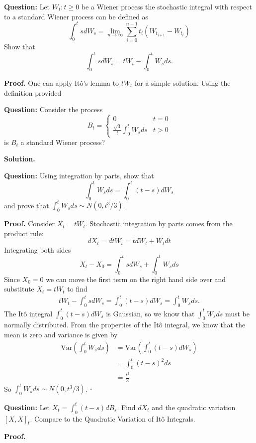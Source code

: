 \documentclass{article}
\begin{document}
\begin{tcolorbox}[colframe=black,colback=gray!5,boxrule=0.5pt]
\textbf{Question:} Let $W_t : t\geq0$ be a Wiener process the stochastic integral with respect to a standard Wiener process can be defined as 
$$\int_0^ts dW_s = \lim_{n\to\infty}\sum_{i=0}^{n-1}t_i(W_{t_{i+1} } - W_{t_i})$$
Show that 
$$\int_0^tsdW_s = tW_t - \int_0^tW_sds.$$
\end{tcolorbox}
\textbf{Proof.} One can apply Itô's lemma to $tW_t$ for a simple solution. Using the definition provided


\begin{tcolorbox}[colframe=black,colback=gray!5,boxrule=0.5pt]
\textbf{Question:} Consider the process 
$$
B_t = \begin{cases}
    0 & t=0 \\
    \frac{\sqrt{3}}{t}\int_0^tW_s ds & t>0
\end{cases}
$$
is $B_t$ a standard Wiener process? 
\end{tcolorbox}
\textbf{Solution.}


\begin{tcolorbox}[colframe=black,colback=gray!5,boxrule=0.5pt]
\textbf{Question:} Using integration by parts, show that 
$$\int_0^tW_sds = \int_0^t(t-s)dW_s$$
and prove that $\int_0^t W_sds\sim N(0, t^3/3)$. 
\end{tcolorbox}
\textbf{Proof.} Consider $X_t = tW_t$. Stochastic integration by parts comes from the product rule: 
$$dX_t = dtW_t = tdW_t +W_tdt$$
Integrating both sides 
$$X_t - X_0 = \int_0^t sdW_s + \int_0^t W_sds$$
Since $X_0 = 0$ we can move the first term on the right hand side over and substitute $X_t = tW_t$ to find 
\begin{align*}
    tW_t - \int_0^tsdW_s = \int_0^t(t-s)dW_s = \int_0^tW_sds.
\end{align*}
The Itô integral $\int_0^t(t-s)dW_s$ is Gaussian, so we know that $\int_0^tW_sds$ must be normally distributed. From the properties of the Itô integral, we know that the mean is zero and variance is given by 
\begin{align*}
    \text{Var}\left(\int_0^tW_sds\right) &= \text{Var}\left(\int_0^t(t-s)dW_s\right) \\
    &= \int_0^t(t-s)^2ds \\
    &= \frac{t^3}{3}
\end{align*}
So $\int_0^tW_sds\sim N(0,t^3/3)$. $\square$

\begin{tcolorbox}[colframe=black,colback=gray!5,boxrule=0.5pt]
\textbf{Question:} Let $X_t = \int_0^t(t-s)dB_s$. Find $dX_t$ and the quadratic variation $[X,X]_t$. Compare to the Quadratic Variation of Itô Integrals.
\end{tcolorbox}
\textbf{Proof.}
\end{document}
